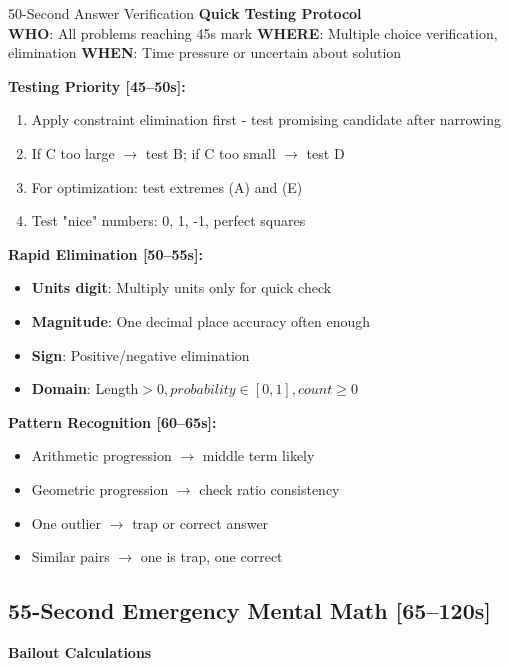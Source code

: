\documentclass{article}
\begin{document}
\begin{mentalbox}{50-Second Answer Verification}
{\footnotesize\textcolor{timegreen}{}}\quad\textbf{Quick Testing Protocol}\\
\textbf{WHO}: All problems reaching 45s mark
\textbf{WHERE}: Multiple choice verification, elimination
\textbf{WHEN}: Time pressure or uncertain about solution

\textbf{Testing Priority [45--50s]:}
\begin{enumerate}[nosep]
\item Apply constraint elimination first - test promising candidate after narrowing
\item If C too large $\rightarrow$ test B; if C too small $\rightarrow$ test D
\item For optimization: test extremes (A) and (E)
\item Test "nice" numbers: 0, 1, -1, perfect squares
\end{enumerate}

\textbf{Rapid Elimination [50--55s]:}
\begin{itemize}[nosep]
\item \textbf{Units digit}: Multiply units only for quick check
\item \textbf{Magnitude}: One decimal place accuracy often enough
\item \textbf{Sign}: Positive/negative elimination
\item \textbf{Domain}: Length$>0, probability\in[0,1], count\geq0$
\end{itemize}

\textbf{Pattern Recognition [60--65s]:}
\begin{itemize}[nosep]
\item Arithmetic progression $\rightarrow$ middle term likely
\item Geometric progression $\rightarrow$ check ratio consistency
\item One outlier $\rightarrow$ trap or correct answer
\item Similar pairs $\rightarrow$ one is trap, one correct
\end{itemize}
\end{mentalbox}

\subsection{55-Second Emergency Mental Math [65--120s]}
{\footnotesize\textcolor{timegreen}{}}\quad\textbf{Bailout Calculations}
\end{document}
